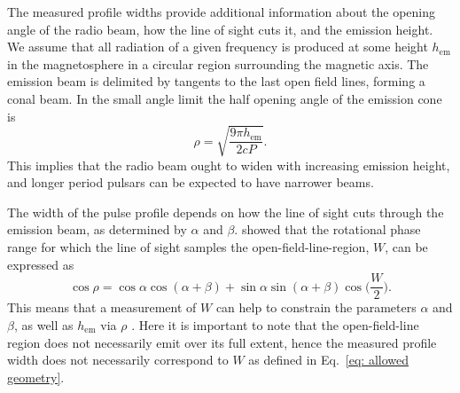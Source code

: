 The measured profile widths provide additional information about the opening angle of the radio beam, how the line of sight cuts it, and the emission height. We assume that all radiation of a given frequency is produced at some height $h_\mathrm{em}$ in the magnetosphere in a circular region surrounding the magnetic axis. The emission beam is delimited by tangents to the last open field lines, forming a conal beam. In the small angle limit \citep[e.g. $h_\mathrm{em} \ll R_\mathrm{LC}$,][]{Rxxx1990} the half opening angle of the emission cone is
\begin{equation}
    \label{eq: cone angle}
    \rho = \sqrt{\frac{9\pi h_\mathrm{em}}{2cP}}.
\end{equation}
This implies that the radio beam ought to widen with increasing emission height, and longer period pulsars can be expected to have narrower beams.

The width of the pulse profile depends on how the line of sight cuts through the emission beam, as determined by $\alpha$ and $\beta$. \citet{GGRx1984} showed that the rotational phase range for which the line of sight samples the open-field-line-region, $W$, can be expressed as
\begin{equation}
    \label{eq: allowed geometry}
    \cos\rho = \cos\alpha\cos(\alpha+\beta)+\sin\alpha\sin(\alpha+\beta)\cos\bigg(\frac{W}{2}\bigg).
\end{equation}
This means that a measurement of $W$ can help to constrain the parameters $\alpha$ and $\beta$, as well as $h_\mathrm{em}$ via $\rho$ \citep[see for example][]{RWJx2015a}. Here it is important to note that the open-field-line region does not necessarily emit over its full extent, hence the measured profile width does not necessarily correspond to $W$ as defined in Eq.~\eqref{eq: allowed geometry}.
    

